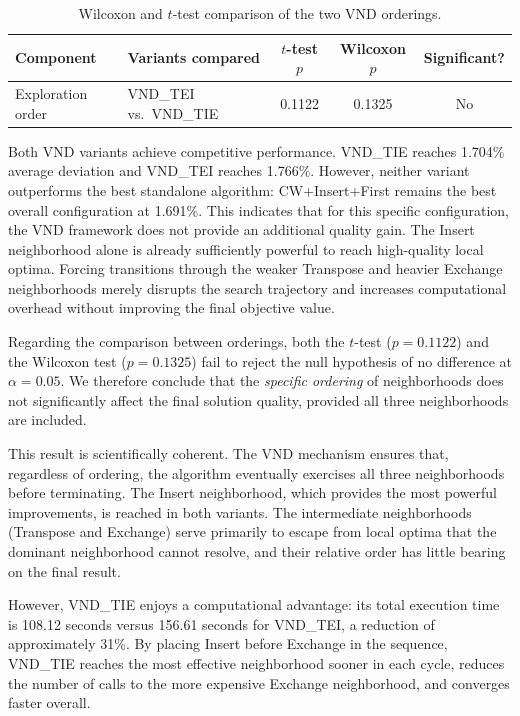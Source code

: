 \documentclass[11pt, a4paper]{article}
\begin{document}
\begin{table}[h]
\centering
\caption{Wilcoxon and $t$-test comparison of the two VND orderings.}
\label{tab:vnd_test}
\begin{tabular}{llccc}
\toprule
\textbf{Component} & \textbf{Variants compared} & \textbf{$t$-test $p$} & \textbf{Wilcoxon $p$} & \textbf{Significant?} \\
\midrule
Exploration order & VND\_TEI vs.\ VND\_TIE & 0.1122 & 0.1325 & No \\
\bottomrule
\end{tabular}
\end{table}

Both VND variants achieve competitive performance. VND\_TIE reaches 1.704\% average deviation and VND\_TEI reaches 1.766\%. However, neither variant outperforms the best standalone algorithm: CW+Insert+First remains the best overall configuration at 1.691\%. This indicates that for this specific configuration, the VND framework does not provide an additional quality gain. The Insert neighborhood alone is already sufficiently powerful to reach high-quality local optima. Forcing transitions through the weaker Transpose and heavier Exchange neighborhoods merely disrupts the search trajectory and increases computational overhead without improving the final objective value.

Regarding the comparison between orderings, both the $t$-test ($p = 0.1122$) and the Wilcoxon test ($p = 0.1325$) fail to reject the null hypothesis of no difference at $\alpha = 0.05$. We therefore conclude that the \emph{specific ordering} of neighborhoods does not significantly affect the final solution quality, provided all three neighborhoods are included.

This result is scientifically coherent. The VND mechanism ensures that, regardless of ordering, the algorithm eventually exercises all three neighborhoods before terminating. The Insert neighborhood, which provides the most powerful improvements, is reached in both variants. The intermediate neighborhoods (Transpose and Exchange) serve primarily to escape from local optima that the dominant neighborhood cannot resolve, and their relative order has little bearing on the final result.

However, VND\_TIE enjoys a computational advantage: its total execution time is 108.12 seconds versus 156.61 seconds for VND\_TEI, a reduction of approximately 31\%. By placing Insert before Exchange in the sequence, VND\_TIE reaches the most effective neighborhood sooner in each cycle, reduces the number of calls to the more expensive Exchange neighborhood, and converges faster overall. 
\end{document}
